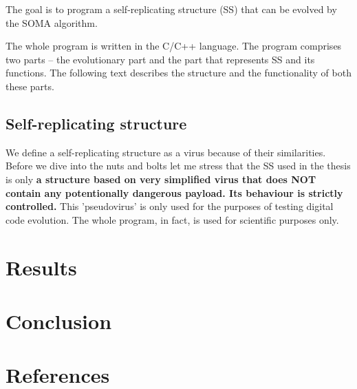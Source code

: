 \documentclass[review]{elsarticle}
\begin{document}
The goal is to program a self-replicating structure (SS) that can be evolved by the SOMA algorithm.

The whole program is written in the C/C++ language. The program comprises two parts -- the evolutionary part and the part that represents SS and its functions. The following text describes the structure and the functionality of both these parts.

\subsection{Self-replicating structure}
We define a self-replicating structure as a virus because of their similarities. Before we dive into the nuts and bolts let me stress that the SS used in the thesis is only \textbf{a structure based on very simplified virus that does NOT contain any potentionally dangerous payload. Its behaviour is strictly controlled.} This 'pseudovirus' is only used for the purposes of testing digital code evolution. The whole program, in fact, is used for scientific purposes only.

\section{Results}

\section{Conclusion}

\newpage
\section*{References}

%
\end{document}
